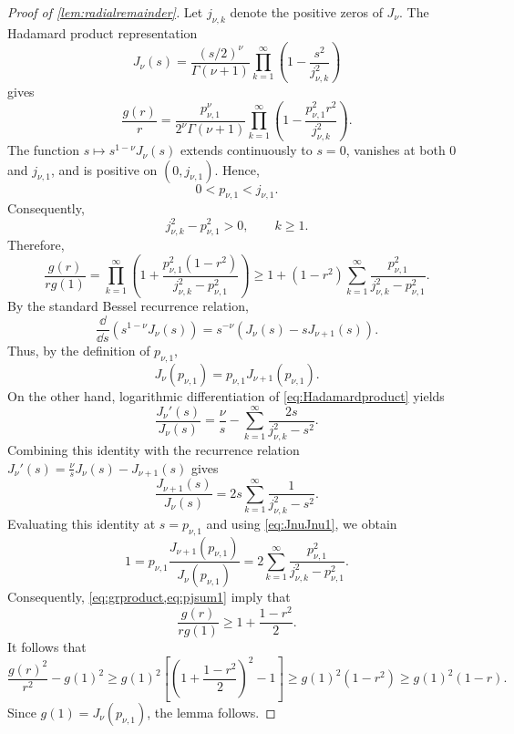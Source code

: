 \documentclass{amsart}
\numberwithin{equation}{section}
\theoremstyle{plain}
\theoremstyle{definition}
\theoremstyle{plain}
\theoremstyle{remark}
\numberwithin{figure}{section}
\begin{document}
\begin{proof}[Proof of \cref{lem:radialremainder}]
    Let $j_{\nu,k}$ denote the positive zeros of $J_\nu$. The Hadamard product representation
    \begin{equation}
        \label{eq:Hadamardproduct}
        J_{\nu}(s)=\frac{(s/2)^\nu}{\Gamma(\nu+1)}\prod_{k=1}^{\infty}\left(1-\frac{s^2}{j_{\nu,k}^2}\right)
    \end{equation}
    gives
    \[
        \frac{g(r)}{r}=\frac{p_{\nu,1}^\nu}{2^\nu\Gamma(\nu+1)}\prod_{k=1}^{\infty}\left(1-\frac{p_{\nu,1}^2r^2}{j_{\nu,k}^2}\right).
    \]
    The function $s\mapsto s^{1-\nu}J_\nu(s)$ extends continuously to $s=0$, vanishes at both $0$ and $j_{\nu,1}$, and is positive on $(0,j_{\nu,1})$. Hence, %
    \[
        0<p_{\nu,1}<j_{\nu,1}.
    \]
    Consequently,
    \[
        j_{\nu,k}^2-p_{\nu,1}^2>0,
        \qquad k\geq 1.
    \]
    Therefore,
    \begin{equation}
        \label{eq:grproduct}
        \frac{g(r)}{rg(1)} = \prod_{k=1}^{\infty} \left( 1+\frac{p_{\nu,1}^2(1-r^2)}{j_{\nu,k}^2-p_{\nu,1}^2} \right) \geq 1+(1-r^2)\sum_{k=1}^{\infty} \frac{p_{\nu,1}^2}{j_{\nu,k}^2-p_{\nu,1}^2}.
    \end{equation}
    By the standard Bessel recurrence relation,
    \[
        \frac{\dd}{\dd s}\left(s^{1-\nu}J_\nu(s)\right) = s^{-\nu}\left(J_\nu(s)-sJ_{\nu+1}(s)\right).
    \]
    Thus, by the definition of $p_{\nu,1}$,
    \begin{equation}
        \label{eq:JnuJnu1}
        J_\nu(p_{\nu,1})=p_{\nu,1}J_{\nu+1}(p_{\nu,1}).
    \end{equation}
    On the other hand, logarithmic differentiation of \cref{eq:Hadamardproduct} yields
    \[
        \frac{J_{\nu}'(s)}{J_{\nu}(s)} = \frac{\nu}{s} - \sum_{k=1}^{\infty}\frac{2s}{j_{\nu,k}^2-s^2}.
    \]
    Combining this identity with the recurrence relation $J_{\nu}'(s)=\frac{\nu}{s}J_{\nu}(s) - J_{\nu+1}(s)$ gives
    \[
        \frac{J_{\nu+1}(s)}{J_\nu(s)} = 2s\sum_{k=1}^{\infty} \frac{1}{j_{\nu,k}^{2}-s^{2}}.
    \]
    Evaluating this identity at $s=p_{\nu,1}$ and using \cref{eq:JnuJnu1}, we obtain
    \begin{equation}
        \label{eq:pjsum1}
        1 = p_{\nu,1}\frac{J_{\nu+1}(p_{\nu,1})}{J_\nu(p_{\nu,1})} = 2\sum_{k=1}^{\infty} \frac{p_{\nu,1}^2}{j_{\nu,k}^2-p_{\nu,1}^2}.
    \end{equation}
    Consequently, \cref{eq:grproduct,eq:pjsum1} imply that
    \[
        \frac{g(r)}{rg(1)} \geq 1+\frac{1-r^2}{2}.
    \]
    It follows that
    \[
        \frac{g(r)^2}{r^2}-g(1)^2 \geq g(1)^2\left[\left(1+\frac{1-r^2}{2}\right)^2-1\right] \geq g(1)^2(1-r^2) \geq g(1)^2(1-r).
    \]
    Since $g(1)=J_\nu(p_{\nu,1})$, the lemma follows.
\end{proof}
    
\end{document}
